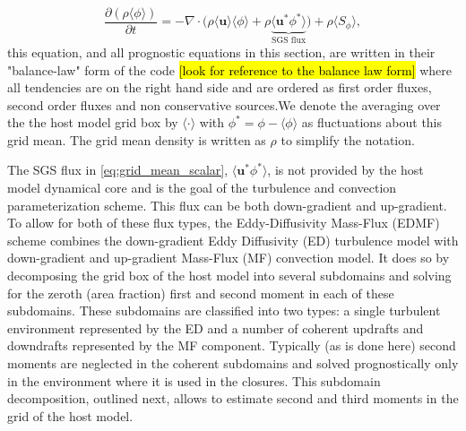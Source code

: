 \documentclass{report}
\begin{document}
\begin{equation}
\label{eq:grid_mean_scalar} 
\frac{\partial (\rho \langle \phi \rangle)}{\partial t} = - \nabla \cdot \Big( \rho\langle \mathbf{u} \rangle \langle \phi \rangle + 
\rho \underbrace{\langle \mathbf{u}^* \phi^* \rangle}_{\text{SGS flux}}\Big) + \rho \langle S_{\phi} \rangle,
\end{equation}
this equation, and all prognostic equations in this section, are written in their "balance-law" form of the code \hl{[look for reference to the balance law form]} where all tendencies are on the right hand side and are ordered as first order fluxes, second order fluxes and non conservative sources.We denote the averaging over the the host model grid box by $\langle \cdot \rangle$ with $\phi^* = \phi - \langle\phi \rangle$ as fluctuations about this grid mean. The grid mean density is written as $\rho$ to simplify the notation. 

The SGS flux in \eqref{eq:grid_mean_scalar}, $\langle \mathbf{u}^* \phi^* \rangle$, is not provided by the host model dynamical core and is the goal of the turbulence and convection parameterization scheme. This flux can be both down-gradient and up-gradient. To allow for both of these flux types, the Eddy-Diffusivity Mass-Flux (EDMF) scheme combines the down-gradient Eddy Diffusivity (ED) turbulence model with down-gradient and up-gradient Mass-Flux (MF) convection model. It does so by decomposing the grid box of the host model into several subdomains and solving for the zeroth (area fraction) first and second moment in each of these subdomains. These subdomains are classified into two types: a single turbulent environment  represented by the ED and a number of coherent updrafts and downdrafts represented by the MF component. Typically (as is done here) second moments are neglected in the coherent subdomains and solved prognostically only in the environment where it is used in the closures. This subdomain decomposition, outlined next, allows to estimate second and third moments in the grid of the host model. 
\end{document}
